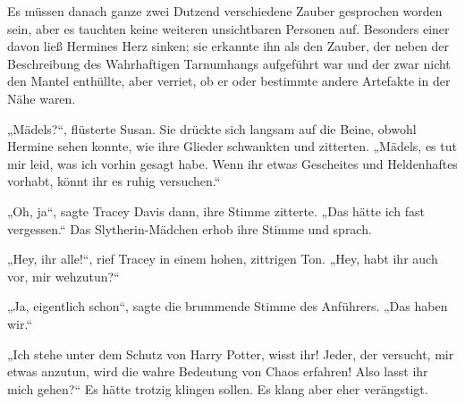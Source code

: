 Es müssen danach ganze zwei Dutzend verschiedene Zauber gesprochen worden sein, aber es tauchten keine weiteren unsichtbaren Personen auf. Besonders einer davon ließ Hermines Herz sinken; sie erkannte ihn als den Zauber, der neben der Beschreibung des Wahrhaftigen Tarnumhangs aufgeführt war und der zwar nicht den Mantel enthüllte, aber verriet, ob er oder bestimmte andere Artefakte in der Nähe waren.

„Mädels?“, flüsterte Susan. Sie drückte sich langsam auf die Beine, obwohl Hermine sehen konnte, wie ihre Glieder schwankten und zitterten.
„Mädels, es tut mir leid, was ich vorhin gesagt habe. Wenn ihr etwas Gescheites und Heldenhaftes vorhabt, könnt ihr es ruhig versuchen.“

„Oh, ja“, sagte Tracey Davis dann, ihre Stimme zitterte.
„Das hätte ich fast vergessen.“ Das Slytherin-Mädchen erhob ihre Stimme und sprach.

„Hey, ihr alle!“, rief Tracey in einem hohen, zittrigen Ton.
„Hey, habt ihr auch vor, mir wehzutun?“

„Ja, eigentlich schon“, sagte die brummende Stimme des Anführers.
„Das haben wir.“

„Ich stehe unter dem Schutz von Harry Potter, wisst ihr! Jeder, der versucht, mir etwas anzutun, wird die wahre Bedeutung von Chaos erfahren! Also lasst ihr mich gehen?“ Es hätte trotzig klingen sollen. Es klang aber eher verängstigt.

